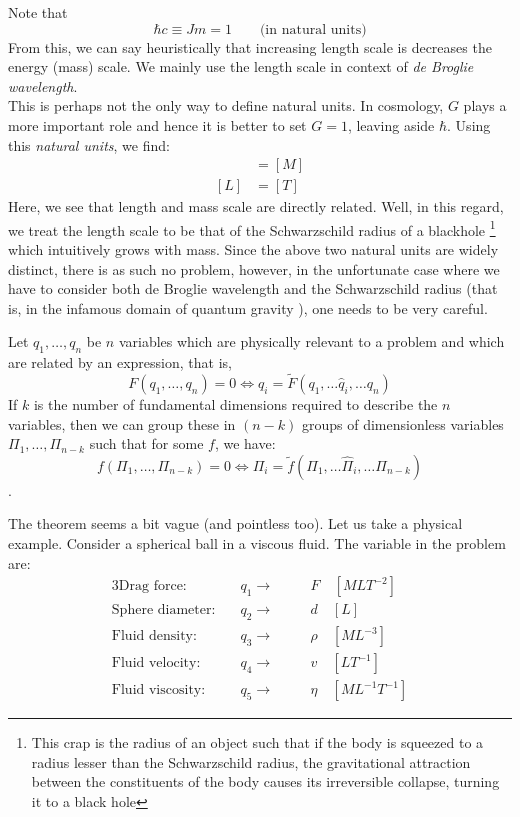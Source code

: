 Note that $$\hbar c \equiv Jm = 1 \qquad \text{(in natural units)}$$
From this, we can say heuristically that increasing length scale is decreases the energy (mass) scale. We mainly use the length scale in context of \textit{de Broglie wavelength}. \\[0.2cm]
This is perhaps not the only way to define natural units. In cosmology, $G$ plays a more important role and hence it is better to set $G=1$, leaving aside $\hbar$. Using this \textit{natural units}, we find:
\begin{align*}
    [L] &=[M]\\
    [L] &=[T]
\end{align*}
Here, we see that length and mass scale are directly related. Well, in this regard, we treat the length scale to be that of the Schwarzschild radius of a blackhole \footnote{This crap is the radius of an object such that if the body is squeezed to a radius lesser than the Schwarzschild radius, the gravitational attraction between the constituents of the body causes its irreversible collapse, turning it to a black hole  } which intuitively grows with mass. Since the above two natural units are widely distinct, there is as such no problem, however, in the unfortunate case where we have to consider both de Broglie wavelength and the Schwarzschild radius (that is, in the infamous domain of quantum gravity ), one needs to be very careful. \\[0.2cm]
\begin{theorem}[$\pi-$Theorem]
    Let $q_1,\ldots, q_n$ be $n$ variables which are physically relevant to a problem and which are related by an expression, that is, 
    $$F(q_1,\ldots,q_n) = 0 \iff q_i = \widetilde{F}(q_1,\ldots\hat{q}_i ,\ldots q_{n})$$
    If $k$ is the number of fundamental dimensions required to describe the $n$ variables, then we can group these in $(n-k)$ groups of dimensionless variables $\Pi_1,\ldots, \Pi_{n-k}$ such that for some $f$, we have:
    $$f(\Pi_1, \ldots, \Pi_{n-k})=0 \iff \Pi_i = \widetilde{f}(\Pi_1,\ldots\hat{\Pi}_i ,\ldots \Pi_{n-k})$$. 
\end{theorem}
The theorem seems a bit vague (and pointless too). Let us take a physical example. Consider a spherical ball in a viscous fluid. The variable in the problem are: 
\begin{alignat*}{3}
    \text{Drag force: }\quad &q_1 \rightarrow \quad&& F  \quad [MLT^{-2}]\\
\text{Sphere diameter:}\quad &q_2\rightarrow\quad&& d \quad [L]\\
\text{Fluid density:}\quad &q_3 \rightarrow\quad&& \rho\quad [ML^{-3}]\\
\text{Fluid velocity:}\quad &q_4 \rightarrow\quad&& v\quad [LT^{-1}]\\
\text{Fluid viscosity:}\quad &q_5 \rightarrow\quad&& \eta\quad [ML^{-1}T^{-1}]
\end{alignat*}
